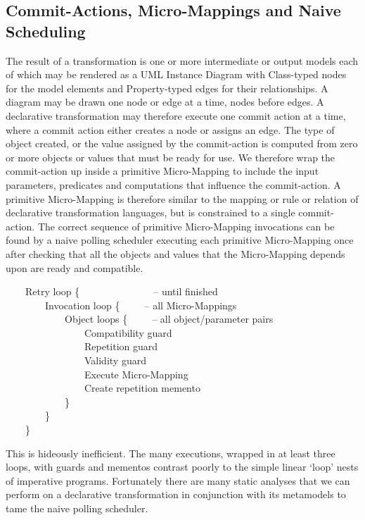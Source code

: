 \documentclass[conference]{IEEEtran}
\begin{document}
\subsection{Commit-Actions, Micro-Mappings and Naive Scheduling}

The result of a transformation is one or more intermediate or output models each of which may be rendered as a UML Instance Diagram with Class-typed nodes for the model elements and Property-typed edges for their relationships. A diagram may be drawn one node or edge at a time, nodes before edges. A declarative transformation may therefore execute one commit action at a time, where a commit action either creates a node or assigns an edge. The type of object created, or the value assigned by the commit-action is computed from zero or more objects or values that must be ready for use. We therefore wrap the commit-action up inside a primitive Micro-Mapping to include the input parameters, predicates and computations that influence the commit-action. A primitive Micro-Mapping is therefore similar to the mapping or rule or relation of declarative transformation languages, but is constrained to a single commit-action. The correct sequence of primitive Micro-Mapping invocations can be found by a naive polling scheduler executing each primitive Micro-Mapping  once after checking that all the objects and values that the Micro-Mapping depends upon are ready and compatible.

\begin{flushleft}
~~~~Retry loop \{~~~~~~~~~~~~~~~-- until finished\\
~~~~~~~~Invocation loop \{~~~~~-- all Micro-Mappings\\
~~~~~~~~~~~~Object loops \{~~~~~-- all object/parameter pairs\\
~~~~~~~~~~~~~~~~Compatibility guard\\
~~~~~~~~~~~~~~~~Repetition guard\\
~~~~~~~~~~~~~~~~Validity guard\\
~~~~~~~~~~~~~~~~Execute Micro-Mapping\\
~~~~~~~~~~~~~~~~Create repetition memento\\
~~~~~~~~~~~~\}\\
~~~~~~~~\}\\
~~~~\}\\
\end{flushleft}

This is hideously inefficient. The many executions, wrapped in at least three loops, with guards and mementos contrast poorly to the simple linear `loop' nests of imperative programs. Fortunately there are many static analyses that we can perform on a declarative transformation in conjunction with its metamodels to tame the naive polling scheduler.
\end{document}
